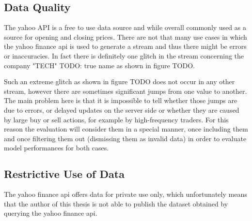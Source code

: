 \subsection{Data Quality}
The yahoo API is a free to use data source and while overall commonly used as a source for opening and closing prices. There are not that many use cases in which the yahoo finance api is used to generate a stream and thus there might be errors or inaccuracies. In fact there is definitely one glitch in the stream concerning the company "TECH" TODO: true name as shown in figure TODO.

Such an extreme glitch as shown in figure TODO does not occur in any other stream, however there are sometimes significant jumps from one value to another. The main problem here is that it is impossible to tell whether those jumps are due to errors, or delayed updates on the server side or whether they are caused by large buy or sell actions, for example by high-frequency traders. For this reason the evaluation will consider them in a special manner, once including them and once filtering them out (dismissing them as invalid data) in order to evaluate model performances for both cases. 

\subsection{Restrictive Use of Data}
The yahoo finance api offers data for private use only, which unfortunately means that the author of this thesis is not able to publish the dataset obtained by querying the yahoo finance api.

